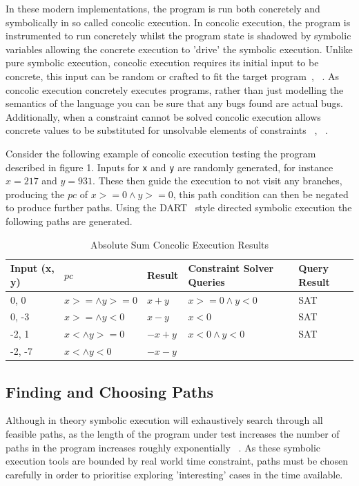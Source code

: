 \documentclass[]{final_report}
\begin{document}
In these modern implementations, the program is run both concretely and symbolically in so called concolic execution. In concolic execution, the program is instrumented to run concretely whilst the program state is shadowed by symbolic variables allowing the concrete execution to 'drive' the symbolic execution. Unlike pure symbolic execution, concolic execution requires its initial input to be concrete, this input can be random or crafted to fit the target program~\cite{godefroid2008grammar}, ~\cite{cadar2013symbolic}. As concolic execution concretely executes programs, rather than just modelling the semantics of the language you can be sure that any bugs found are actual bugs. Additionally, when a constraint cannot be solved concolic execution allows concrete values to be substituted for unsolvable elements of constraints ~\cite{sen2007concolic}, ~\cite{sen2005cute}.

Consider the following example of concolic execution testing the program described in figure 1. Inputs for \lstinline {x} and \lstinline {y} are randomly generated, for instance $x=217$ and $y=931$. These then guide the execution to not visit any branches, producing the $pc$ of $x >= 0 \land y >=0$, this path condition can then be negated to produce further paths. Using the DART~\cite{godefroid2005dart} style directed symbolic execution the following paths are generated.

\begin{table}[]
\centering
\caption{Absolute Sum Concolic Execution Results}
\label{abs-sum-ce-table}
\begin{tabular}{|l|l|l|l|l|}
\hline
Input (x, y) & $pc$ & Result & Constraint Solver Queries & Query Result \\ \hline
0, 0 & $x >= \land y >= 0$ & $x+y$ & $x >=0 \land y < 0 $ & SAT \\ \hline
0, -3 & $x >= \land y < 0$ & $x - y$ & $x <0 $ & SAT \\ \hline
-2, 1 & $x < \land y >= 0$ & $-x+y$ & $x<0 \land y < 0 $ & SAT \\ \hline
-2, -7 & $x < \land y < 0$ & $-x-y$ &  &  \\ \hline
\end{tabular}
\end{table}

\subsection{Finding and Choosing Paths}

Although in theory symbolic execution will exhaustively search through all feasible paths, as the length of the program under test increases the number of paths in the program increases roughly exponentially ~\cite{cadar2013symbolic}. As these symbolic execution tools are bounded by real world time constraint, paths must be chosen carefully in order to prioritise exploring 'interesting' cases in the time available.
\end{document}
